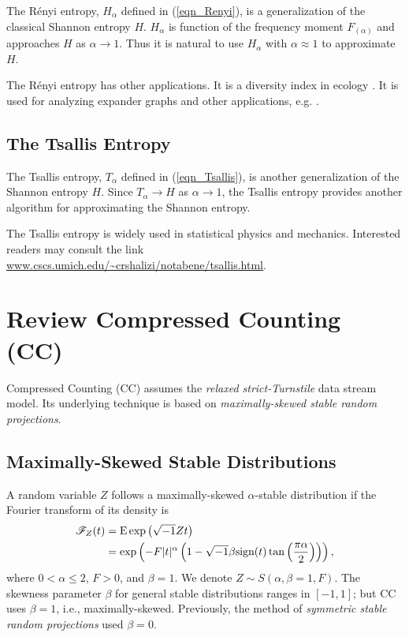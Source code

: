 \documentclass{sig-alternate}
\begin{document}
The R\'enyi entropy, $H_\alpha$ defined in (\ref{eqn_Renyi}), is a generalization of the classical Shannon entropy $H$. $H_\alpha$ is function of the frequency moment $F_{(\alpha)}$ and approaches $H$ as $\alpha \rightarrow 1$. Thus it is natural to use $H_\alpha$ with $\alpha\approx 1$ to approximate $H$.

The R\'enyi entropy has other applications. It is a diversity index in ecology \cite{Article:Tothmeresz_95,Article:Ricotta_02,Article:Liu_06}. It is used for analyzing expander graphs\cite{Article:Hoory_06} and other applications, e.g. \cite{Article:Zyczkowski_03}.


\subsection{The Tsallis Entropy}

The Tsallis entropy, $T_{\alpha}$  defined in (\ref{eqn_Tsallis}), is another generalization of the Shannon entropy $H$. Since $T_{\alpha}\rightarrow H$ as $\alpha\rightarrow 1$, the Tsallis entropy provides another algorithm for approximating the Shannon entropy.

The Tsallis entropy is widely used in statistical physics and  mechanics. Interested readers may consult the link \\ \url{www.cscs.umich.edu/~crshalizi/notabene/tsallis.html}.


\section{Review Compressed Counting (CC)}\label{sec_CC}


Compressed Counting (CC) assumes the {\em relaxed strict-Turnstile} data stream model. Its underlying technique is based on {\em maximally-skewed stable random projections}.

\subsection{Maximally-Skewed Stable Distributions}

A random variable
$Z$ follows a maximally-skewed $\alpha$-stable distribution if the Fourier transform of its density  is\cite{Book:Zolotarev_86}
\begin{align}\notag
{\mathscr{F}}_Z(t) &= \text{E}\exp\left(\sqrt{-1}Zt\right)\\\notag
&= \exp\left(-F|t|^\alpha\left(1-\sqrt{-1}\beta\text{sign}(t)\tan\left(\frac{\pi\alpha}{2}\right)\right)\right),
\end{align}
where $0<\alpha \leq 2$, $F>0$, and $\beta = 1$. We denote $Z\sim S(\alpha,\beta=1,F)$.
The skewness parameter $\beta$ for general stable distributions ranges in $[-1,1]$; but CC uses $\beta = 1$, i.e., maximally-skewed. Previously, the method of {\em symmetric stable random projections}\cite{Article:Indyk_JACM06,Proc:Li_SODA08} used $\beta = 0$.
\end{document}
